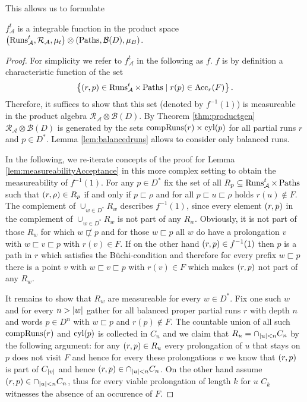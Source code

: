 This allows us to formulate
\begin{lemma}
  \cite[Lemma 36]{RandAutoInfTrees}
  $f_{\mathcal{A}}^{t}$ is a integrable function in the product space
  $\left(\operatorname{Runs}_{\mathcal{A}}^{t}, \mathcal{R}_{\mathcal{A}},\mu_{t}\right)\otimes
    \left(\operatorname{Paths}, \mathcal{B}(D), \mu_{B}\right)$.
\end{lemma}
\begin{proof}
  For simplicity we refer to $f_{\mathcal{A}}^{t}$ in the following as $f$.
  $f$ is by definition a characteristic function of the set
  \begin{equation*}
    \left\{\left(r,p\right)\in\operatorname{Runs}_{\mathcal{A}}^{t}\times\operatorname{Paths}\mid
      r(p)\in\operatorname{Acc}_{r}(F)\right\}.
  \end{equation*}
  Therefore, it suffices to show that this set (denoted by $f^{-1}(1)$) is 
  measureable in the product algebra 
  $\mathcal{R}_{\mathcal{A}}\otimes\mathcal{B}(D)$. By Theorem 
  \ref{thm:productgen} $\mathcal{R}_{\mathcal{A}}\otimes\mathcal{B}(D)$ is 
  generated by the sets $\operatorname{compRuns}(r)\times\operatorname{cyl}(p)$ for all partial runs $r$ 
  and $p\in D^{*}$. Lemma \ref{lem:balancedruns} allows to consider only
  balanced runs.

  In the following, we re-iterate concepts of the proof for Lemma 
  \ref{lem:measureabilityAcceptance} in this more complex setting to obtain the
  measureability of $f^{-1}(1)$. For any $p\in D^{*}$ fix the set of all 
  $R_{p}\subseteq\operatorname{Runs}_{\mathcal{A}}^{t}\times\operatorname{Paths}$ such that
  $\left(r,\rho\right)\in R_{p}$ if and only if $p\sqsubset\rho$ and for all
  $p\sqsubset u\sqsubset\rho$ holds $r(u)\notin F$. The complement of
  $\cup_{w\in D^{*}}R_{w}$ describes $f^{-1}(1)$, since every element
  $\left(r,p\right)$ in the complement of $\cup_{w\in D^{*}}R_{w}$ is not part of
  any $R_{w}$. Obviously, it is not part of those $R_{w}$ for which
  $w\not\sqsubset p$ and for those $w\sqsubset p$ all $w$ do have a
  prolongation $v$ with $w\sqsubset v\sqsubset p$ with $r(v)\in F$. If on the
  other hand $\left(r,p\right)\in f^{-1}(1)$ then $p$ is a path in $r$ which
  satisfies the Büchi-condition and therefore for every prefix $w\sqsubset p$
  there is a point $v$ with $w\sqsubset v\sqsubset p$ with $r(v)\in F$ which
  makes $\left(r,p\right)$ not part of any $R_{w}$.

  It remains to show that $R_{w}$ are measureable for every $w\in D^{*}$. Fix
  one such $w$ and for every $n>\left\vert{w}\right\vert$ gather for all balanced proper
  partial runs $r$ with depth $n$ and words $p\in D^{n}$ with $w\sqsubset p$
  and $r(p)\notin F$. The countable union of all such $\operatorname{compRuns}(r)$ and
  $\operatorname{cyl}(p)$ is collected in $C_{n}$ and we claim that
  $R_{u} = \cap_{\left\vert{u}\right\vert<n}C_{n}$ by the following argument: for any
  $\left(r,p\right)\in R_{u}$ every prolongation of $u$ that stays on $p$ does not
  visit $F$ and hence for every these prolongations $v$ we know that
  $\left(r,p\right)$ is part of $C_{\left\vert{v}\right\vert}$ and hence
  $\left(r,p\right)\in\cap_{\left\vert{u}\right\vert<n}C_{n}$. On the other hand assume
  $\left(r,p\right)\in\cap_{\left\vert{u}\right\vert<n}C_{n}$, thus for every viable prolongation
  of length $k$ for $u$ $C_{k}$ witnesses the absence of an occurence of $F$.


\end{proof}
